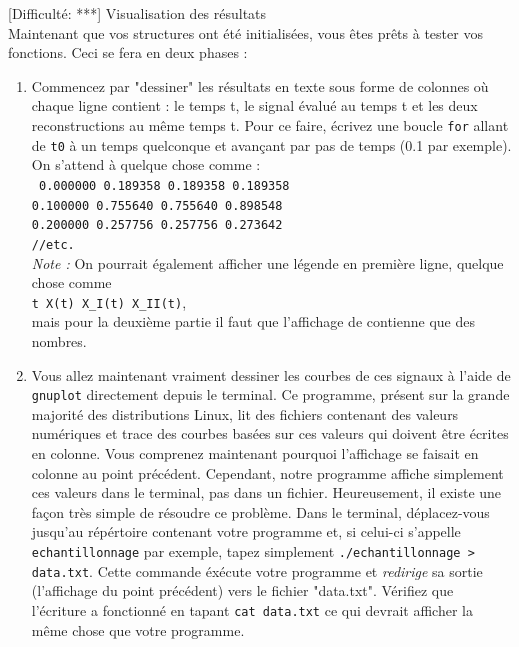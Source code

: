 \documentclass[11pt]{article}
\newcommand\tab[1][1cm]{\hspace*{#1}}
\begin{document}
\textcolor{mygreen}{[Difficulté: ***]} Visualisation des résultats\\
Maintenant que vos structures ont été initialisées, vous êtes prêts à tester vos fonctions. Ceci se fera en deux phases :
\begin{enumerate}
\item Commencez par "dessiner" les résultats en texte sous forme de colonnes où chaque ligne contient : le temps t, le signal évalué au temps t et les deux reconstructions au même temps t. Pour ce faire, écrivez une boucle \texttt{for} allant de \texttt{t0} à un temps quelconque et avançant par pas de temps (0.1 par exemple).\\
 On s'attend à quelque chose comme :\\
\texttt{
0.000000   0.189358   0.189358   0.189358\\
0.100000   0.755640   0.755640   0.898548\\
0.200000   0.257756   0.257756   0.273642\\
//etc.\\
}
\textit{Note :} On pourrait également afficher une légende en première ligne, 
quelque chose comme\\
 \texttt{t \tab X(t) \tab X\_I(t) \tab X\_II(t)},\\
mais pour la deuxième partie il faut que l'affichage de contienne que des nombres.

\item Vous allez maintenant vraiment dessiner les courbes de ces signaux à l'aide de \texttt{gnuplot} directement depuis le terminal. Ce programme, présent sur la grande majorité des distributions Linux, lit des fichiers contenant des valeurs numériques et trace des courbes basées sur ces valeurs qui doivent être écrites en colonne. Vous comprenez maintenant pourquoi l'affichage se faisait en colonne au point précédent. Cependant, notre programme affiche simplement ces valeurs dans le terminal, pas dans un fichier. Heureusement, il existe une façon très simple de résoudre ce problème. Dans le terminal, déplacez-vous jusqu'au répértoire contenant votre programme et, si celui-ci s'appelle \texttt{echantillonnage} par exemple, tapez simplement \texttt{./echantillonnage > data.txt}. Cette commande éxécute votre programme et \textit{redirige} sa sortie (l'affichage du point précédent) vers le fichier "data.txt". Vérifiez que l'écriture a fonctionné en tapant \texttt{cat data.txt} ce qui devrait afficher la même chose que votre programme.


\end{enumerate}
\end{document}
